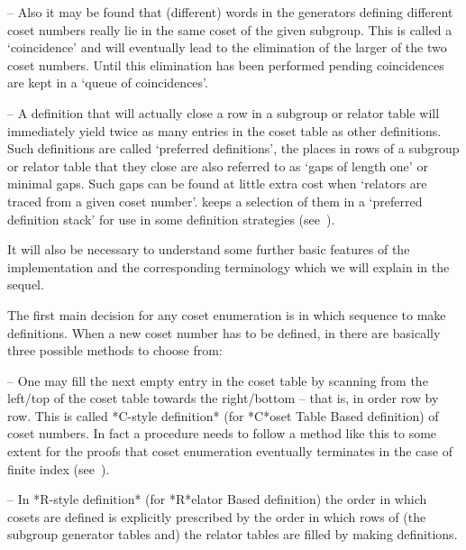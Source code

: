 \item{--} Also   it  may  be  found  that  (different)  words  in  the
generators defining different coset numbers really  lie  in  the  same
coset of the given subgroup. This is called  a  \lq{}coincidence'  and
will eventually lead to the elimination of the larger of the two coset
numbers.  Until  this   elimination   has   been   performed   pending
coincidences are kept in a \lq{}queue of coincidences'.

\item{--} A definition that will actually close a row in a subgroup or
relator table will immediately yield twice  as  many  entries  in  the
coset  table  as  other  definitions.  Such  definitions  are   called
\lq{}preferred definitions', the places  in  rows  of  a  subgroup  or
relator table that they close are also referred  to  as  \lq{}gaps  of
length one' or minimal gaps. Such gaps can be found  at  little  extra
cost when \lq{}relators are traced from a given coset number'.  {\ACE}
keeps a selection of them in a \lq{}preferred  definition  stack'  for
use in some definition strategies (see~\cite{Hav91}).

\endlist

It will also be necessary to understand some further basic features of
the  implementation and  the corresponding  terminology which  we will
explain in the sequel.


The first main decision for any coset enumeration is in which sequence
to make definitions. When a new coset number has  to  be  defined,  in
{\ACE} there are basically three possible methods to choose from:

\beginlist

\item{--} One may fill the next empty entry  in  the  coset  table  by
scanning from the left/top of the coset table towards the right/bottom
-- that is, in order row by row. This is called  *C-style  definition*
(for *C*oset Table Based definition)  of  coset  numbers.  In  fact  a
procedure needs to follow a method like this to some  extent  for  the
proofs that coset enumeration eventually terminates  in  the  case  of
finite index (see~\cite{Neu82}).

\item{--} In *R-style definition* (for *R*elator Based definition) the
order  in which  cosets are  defined is  explicitly prescribed  by the
order in which rows of (the subgroup generator tables and) the relator
tables are filled by making definitions.

